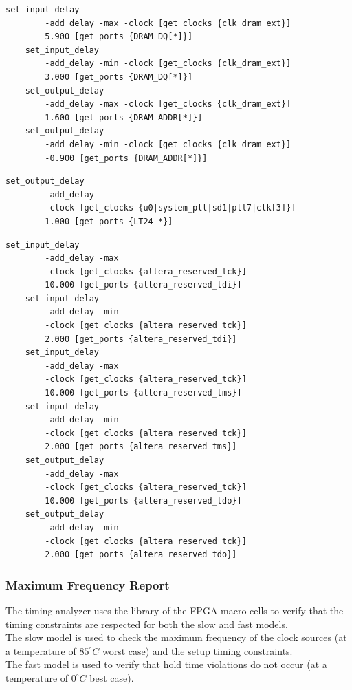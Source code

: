 \vspace{1em}
\begin{lstlisting}[language=sdc, caption=Paths constraints for SDRAM]
    set_input_delay 
        -add_delay -max -clock [get_clocks {clk_dram_ext}]  
        5.900 [get_ports {DRAM_DQ[*]}]
    set_input_delay 
        -add_delay -min -clock [get_clocks {clk_dram_ext}]  
        3.000 [get_ports {DRAM_DQ[*]}]
    set_output_delay 
        -add_delay -max -clock [get_clocks {clk_dram_ext}]
        1.600 [get_ports {DRAM_ADDR[*]}]
    set_output_delay 
        -add_delay -min -clock [get_clocks {clk_dram_ext}]  
        -0.900 [get_ports {DRAM_ADDR[*]}]
\end{lstlisting}

\begin{lstlisting}[language=sdc, caption=Paths constraints for LT24 module]
    set_output_delay 
        -add_delay  
        -clock [get_clocks {u0|system_pll|sd1|pll7|clk[3]}]  
        1.000 [get_ports {LT24_*}]
\end{lstlisting}

\begin{lstlisting}[language=sdc, caption=Paths constraints for JTAG Debug Module (USB Blaster)]
    set_input_delay 
        -add_delay -max 
        -clock [get_clocks {altera_reserved_tck}]  
        10.000 [get_ports {altera_reserved_tdi}]
    set_input_delay 
        -add_delay -min 
        -clock [get_clocks {altera_reserved_tck}]  
        2.000 [get_ports {altera_reserved_tdi}]
    set_input_delay 
        -add_delay -max 
        -clock [get_clocks {altera_reserved_tck}]  
        10.000 [get_ports {altera_reserved_tms}]
    set_input_delay 
        -add_delay -min 
        -clock [get_clocks {altera_reserved_tck}]  
        2.000 [get_ports {altera_reserved_tms}]
    set_output_delay 
        -add_delay -max 
        -clock [get_clocks {altera_reserved_tck}]  
        10.000 [get_ports {altera_reserved_tdo}]
    set_output_delay 
        -add_delay -min 
        -clock [get_clocks {altera_reserved_tck}]  
        2.000 [get_ports {altera_reserved_tdo}]  
\end{lstlisting}

\newpage
\subsubsection{Maximum Frequency Report}
The timing analyzer uses the library of the FPGA macro-cells to verify that the timing constraints are respected for both the slow and fast models.\\
The slow model is used to check the maximum frequency of the clock sources (at a temperature of \(85^\circ C\) worst case) and the setup timing constraints.\\
The fast model is used to verify that hold time violations do not occur (at a temperature of \(0^\circ C\) best case).

